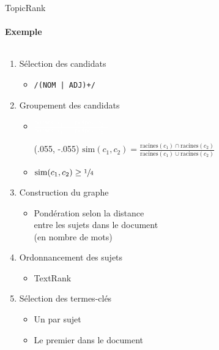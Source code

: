\begin{frame}{TopicRank}\framesubtitle{Exemple}
  \begin{columns}
    \begin{column}{.45\linewidth}
      \begin{enumerate}\setlength{\itemindent}{-.75cm}
        \item<1->{Sélection des candidats}
          \begin{itemize}\setlength{\itemindent}{-1.1cm}
          \item{\texttt{/(NOM | ADJ)+/}}
        \end{itemize}
        \item<2->{Groupement des candidats}
        \begin{itemize}\setlength{\itemindent}{-1.1cm}
          \item{\textcolor{white}{$\frac{\text{racines}(c_1) \cap \text{racines}(c_2)}{\text{racines}(c_1) \cup \text{racines}(c_2)}$}}
          \begin{textblock*}{\textwidth}(.055\textwidth, -.055\textheight)
            $\text{sim}(c_1, c_2) = \frac{\text{racines}(c_1) \cap \text{racines}(c_2)}{\text{racines}(c_1) \cup \text{racines}(c_2)}$
          \end{textblock*}
          \item{$\text{sim}(c_1, c_2) \geq \sfrac{1}{4}$}
        \end{itemize}
        \item<3->{Construction du graphe}
        \begin{itemize}\setlength{\itemindent}{-1.1cm}
          \item{
            Pondération selon la distance\\
            \hspace{-1.1cm}entre les sujets dans le document\\
            \hspace{-1.1cm}(en nombre de mots)}
        \end{itemize}
        \item<4->{Ordonnancement des sujets}
        \begin{itemize}\setlength{\itemindent}{-1.1cm}
          \item{TextRank}
        \end{itemize}
        \item<5->{Sélection des termes-clés}
        \begin{itemize}\setlength{\itemindent}{-1.1cm}
          \item{Un par sujet}
          \item{Le premier dans le document}
        \end{itemize}
      \end{enumerate}
    \end{column}


\end{columns}
\end{frame}

